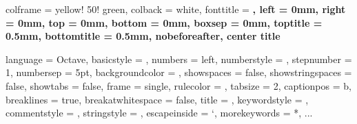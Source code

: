 \usepackage{makeidx}
\makeindex
\usepackage[russian]{babel}
\let\captionsrussian\empty
\let\daterussian\empty
\usepackage{graphicx}
\graphicspath{{./src/}}
\usepackage{tcolorbox}
\tcbset
{	colframe = yellow! 50! green, 
	colback = white, 
	fonttitle = \bfseries, 
	left = 0mm, 
	right = 0mm, 
	top = 0mm, 
	bottom = 0mm, 
	boxsep = 0mm, 
 	toptitle = 0.5mm, 
 	bottomtitle = 0.5mm, 
	nobeforeafter, center title
}
\usepackage{listings}
\lstset
{	language = Octave, 			%
	basicstyle = \footnotesize, 		%
	numbers = left, 				%
	numberstyle = \tiny\color{gray}, 	%
	stepnumber = 1, 			%
	numbersep = 5pt, 			%
	backgroundcolor = \color{white}, %
	showspaces = false, 			%
	showstringspaces = false, 		%
	showtabs = false, 			%
	frame = single, 				%
	rulecolor = \color{black}, 		%
	tabsize = 2, 				%
	captionpos = b, 				%
	breaklines = true, 			%
	breakatwhitespace = false, 	%
	title = \lstname, 				%
	keywordstyle = \color{blue}, 	%
	commentstyle = \color{dkgreen}, %
	stringstyle = \color{mauve}, 	%
	escapeinside = {`}, 			%
	morekeywords = {*, ...}		%
}
\usepackage{printlen}
